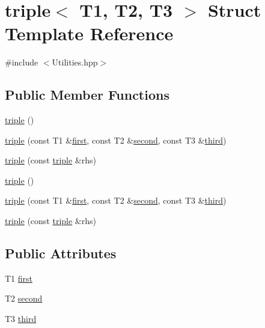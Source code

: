 \hypertarget{structtriple}{\section{triple$<$ T1, T2, T3 $>$ Struct Template Reference}
\label{structtriple}
}


{\ttfamily \#include $<$Utilities.\+hpp$>$}

\subsection*{Public Member Functions}
\begin{DoxyCompactItemize}
\item 
\hyperlink{structtriple_a3bdf8136df773fff422b4cbb354cf749}{triple} ()
\item 
\hyperlink{structtriple_a8da4925a9c7fe1816a9518d026131ecc}{triple} (const T1 \&\hyperlink{structtriple_a6aa8508e6e6f859dda04f144f361c0d2}{first}, const T2 \&\hyperlink{structtriple_a41050194c8c7984707c7ad13c96e8631}{second}, const T3 \&\hyperlink{structtriple_a5675f08ea7996033edbcf7074404cdd8}{third})
\item 
\hyperlink{structtriple_adc74ee1260c2379a96f07a9182c0ad9a}{triple} (const \hyperlink{structtriple}{triple} \&rhs)
\item 
\hyperlink{structtriple_a3bdf8136df773fff422b4cbb354cf749}{triple} ()
\item 
\hyperlink{structtriple_a8da4925a9c7fe1816a9518d026131ecc}{triple} (const T1 \&\hyperlink{structtriple_a6aa8508e6e6f859dda04f144f361c0d2}{first}, const T2 \&\hyperlink{structtriple_a41050194c8c7984707c7ad13c96e8631}{second}, const T3 \&\hyperlink{structtriple_a5675f08ea7996033edbcf7074404cdd8}{third})
\item 
\hyperlink{structtriple_adc74ee1260c2379a96f07a9182c0ad9a}{triple} (const \hyperlink{structtriple}{triple} \&rhs)
\end{DoxyCompactItemize}
\subsection*{Public Attributes}
\begin{DoxyCompactItemize}
\item 
T1 \hyperlink{structtriple_a6aa8508e6e6f859dda04f144f361c0d2}{first}
\item 
T2 \hyperlink{structtriple_a41050194c8c7984707c7ad13c96e8631}{second}
\item 
T3 \hyperlink{structtriple_a5675f08ea7996033edbcf7074404cdd8}{third}
\end{DoxyCompactItemize}


